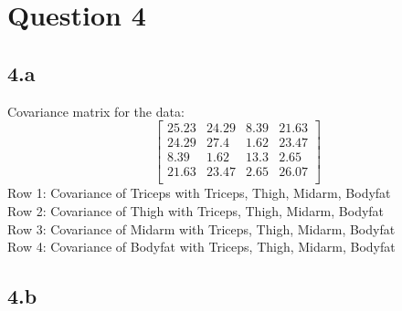 \documentclass[12pt]{article}
\begin{document}
\section*{Question 4}
\subsection*{4.a}
Covariance matrix for the data:
\[\begin{bmatrix}
    25.23 & 24.29 & 8.39 & 21.63 \\
    24.29 & 27.4  & 1.62 & 23.47 \\
    8.39  & 1.62  & 13.3 & 2.65  \\
    21.63 & 23.47 & 2.65 & 26.07 \\
    \end{bmatrix}\]
Row 1: Covariance of Triceps with Triceps, Thigh, Midarm, Bodyfat
\\
Row 2: Covariance of Thigh with Triceps, Thigh, Midarm, Bodyfat
\\
Row 3: Covariance of Midarm with Triceps, Thigh, Midarm, Bodyfat
\\
Row 4: Covariance of Bodyfat with Triceps, Thigh, Midarm, Bodyfat

\newpage
\subsection*{4.b}
\end{document}
